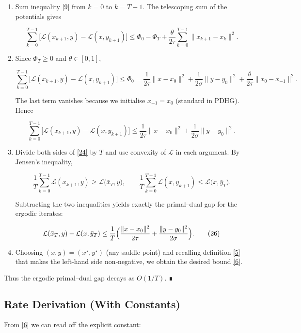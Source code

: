 \documentclass{article}
\begin{document}
\begin{enumerate}
\item[Step 1.] Sum inequality \eqref{9} from \(k=0\) to \(k=T-1\). The telescoping sum of the potentials gives

\[
\sum_{k=0}^{T-1}\bigl[\mathcal{L}(x_{k+1},y)-\mathcal{L}(x,y_{k+1})\bigr]
\le
\Phi_{0}-\Phi_{T}
+\frac{\theta}{2\tau}\sum_{k=0}^{T-1}\|x_{k+1}-x_{k}\|^{2}.
\tag{22}
\]

\item[Step 2.] Since \(\Phi_{T}\ge 0\) and \(\theta\in[0,1]\),

\[
\sum_{k=0}^{T-1}\bigl[\mathcal{L}(x_{k+1},y)-\mathcal{L}(x,y_{k+1})\bigr]
\le
\Phi_{0}
= \frac{1}{2\tau}\|x-x_{0}\|^{2}
+ \frac{1}{2\sigma}\|y-y_{0}\|^{2}
+ \frac{\theta}{2\tau}\|x_{0}-x_{-1}\|^{2}.
\tag{23}
\]

The last term vanishes because we initialise \(x_{-1}=x_{0}\) (standard in PDHG). Hence

\[
\sum_{k=0}^{T-1}\bigl[\mathcal{L}(x_{k+1},y)-\mathcal{L}(x,y_{k+1})\bigr]
\le
\frac{1}{2\tau}\|x-x_{0}\|^{2}
+ \frac{1}{2\sigma}\|y-y_{0}\|^{2}.
\tag{24}
\]

\item[Step 3.] Divide both sides of \eqref{24} by \(T\) and use convexity of \(\mathcal{L}\) in each argument. By Jensen’s inequality,

\[
\frac{1}{T}\sum_{k=0}^{T-1}\mathcal{L}(x_{k+1},y)
\ge \mathcal{L}\!\bigl(\bar{x}_{T},y\bigr),\qquad
\frac{1}{T}\sum_{k=0}^{T-1}\mathcal{L}(x,y_{k+1})
\le \mathcal{L}\!\bigl(x,\bar{y}_{T}\bigr).
\tag{25}
\]

Subtracting the two inequalities yields exactly the primal–dual gap for the ergodic iterates:

\[
\mathcal{L}(\bar{x}_{T},y)-\mathcal{L}(x,\bar{y}_{T})
\le
\frac{1}{T}\Bigl(
\frac{\|x-x_{0}\|^{2}}{2\tau}
+\frac{\|y-y_{0}\|^{2}}{2\sigma}
\Bigr).
\tag{26}
\]

\item[Step 4.] Choosing \((x,y)=(x^{\star},y^{\star})\) (any saddle point) and recalling definition \eqref{5} that makes the left‑hand side non‑negative, we obtain the desired bound \eqref{6}.

\end{enumerate}

Thus the ergodic primal–dual gap decays as \(O(1/T)\). ∎

\subsection*{Rate Derivation (With Constants)}
From \eqref{6} we can read off the explicit constant:
\end{document}
